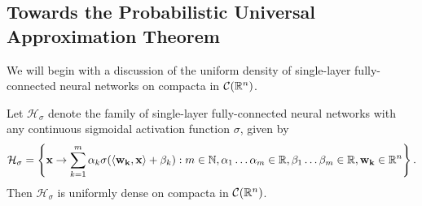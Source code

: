 \subsection{Towards the Probabilistic Universal Approximation Theorem}
\label{subsection:universality:measure:towards_probabilistic_uap}

We will begin with a discussion of the uniform density of single-layer fully-connected neural networks on compacta in ${\mathcal C}({\mathbb R}^n)$.
\begin{theorem}
\label{thm:universality:measure:uap:nnsdensecompacta}
Let $\mathcal{H}_{\sigma}$ denote the family of single-layer fully-connected neural networks with any continuous sigmoidal activation function $\sigma$, given by \begin{align*}
\mathcal{H}_{\sigma} = \left \{ \mathbf{x} \to \sum_{k=1}^{m} \alpha_k \sigma{\left (\langle \mathbf{w_k}, \mathbf{x} \rangle + \beta_k \right)} : m \in {\mathbb N}, \alpha_1 \ldots \alpha_m \in {\mathbb R},  \beta_1 \ldots \beta_m \in {\mathbb R}, \mathbf{w_k} \in {\mathbb R}^n \right \}.
\end{align*}
Then $\mathcal{H}_{\sigma}$ is uniformly dense on compacta in ${\mathcal C}({\mathbb R}^n)$.
\end{theorem}

